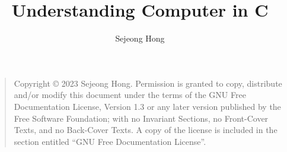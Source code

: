 \documentclass{book}
\title{Understanding Computer in C}
\date{}
\author{Sejeong Hong}
\begin{document}
    \frontmatter
    \maketitle
    \begin{quote}
    Copyright \copyright{}  2023 Sejeong Hong.
    Permission is granted to copy, distribute and/or modify this document
    under the terms of the GNU Free Documentation License, Version 1.3
    or any later version published by the Free Software Foundation;
    with no Invariant Sections, no Front-Cover Texts, and no Back-Cover Texts.
    A copy of the license is included in the section entitled ``GNU
    Free Documentation License''.
    \end{quote}
    \tableofcontents
    

    \mainmatter

    \appendix
    
\end{document}
